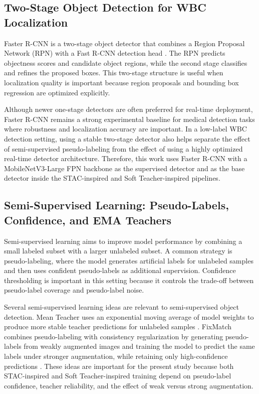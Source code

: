 \documentclass[conference,a4paper]{IEEEtran}
\begin{document}
\subsection{Two-Stage Object Detection for WBC Localization}
Faster R-CNN is a two-stage object detector that combines a Region Proposal Network (RPN) with a Fast R-CNN detection head \cite{ren2015faster}. The RPN predicts objectness scores and candidate object regions, while the second stage classifies and refines the proposed boxes. This two-stage structure is useful when localization quality is important because region proposals and bounding box regression are optimized explicitly.

Although newer one-stage detectors are often preferred for real-time deployment, Faster R-CNN remains a strong experimental baseline for medical detection tasks where robustness and localization accuracy are important. In a low-label WBC detection setting, using a stable two-stage detector also helps separate the effect of semi-supervised pseudo-labeling from the effect of using a highly optimized real-time detector architecture. Therefore, this work uses Faster R-CNN with a MobileNetV3-Large FPN backbone as the supervised detector and as the base detector inside the STAC-inspired and Soft Teacher-inspired pipelines.

\subsection{Semi-Supervised Learning: Pseudo-Labels, Confidence, and EMA Teachers}
Semi-supervised learning aims to improve model performance by combining a small labeled subset with a larger unlabeled subset. A common strategy is pseudo-labeling, where the model generates artificial labels for unlabeled samples and then uses confident pseudo-labels as additional supervision. Confidence thresholding is important in this setting because it controls the trade-off between pseudo-label coverage and pseudo-label noise.

Several semi-supervised learning ideas are relevant to semi-supervised object detection. Mean Teacher uses an exponential moving average of model weights to produce more stable teacher predictions for unlabeled samples \cite{tarvainen2017meanteacher}. FixMatch combines pseudo-labeling with consistency regularization by generating pseudo-labels from weakly augmented images and training the model to predict the same labels under stronger augmentation, while retaining only high-confidence predictions \cite{sohn2020fixmatch}. These ideas are important for the present study because both STAC-inspired and Soft Teacher-inspired training depend on pseudo-label confidence, teacher reliability, and the effect of weak versus strong augmentation.
\end{document}
